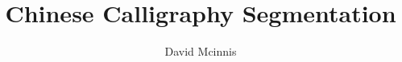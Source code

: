 \documentclass{ewuthesis}
\begin{document}
    \title{Chinese Calligraphy Segmentation}
    \author{David Mcinnis}
    
    
    \maketitle
    
    
\end{document}
